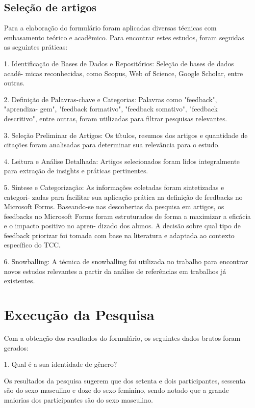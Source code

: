 \subsection{Seleção de artigos}

Para a elaboração do formulário foram aplicadas diversas técnicas com embasamento teórico e acadêmico. Para encontrar estes estudos, foram seguidas as seguintes práticas:

1. Identificação de Bases de Dados e Repositórios: Seleção de bases de dados acadê-
micas reconhecidas, como Scopus, Web of Science, Google Scholar, entre outras.

2. Definição de Palavras-chave e Categorias: Palavras como "feedback", "aprendiza-
gem", "feedback formativo", "feedback somativo", "feedback descritivo", entre outras, foram
utilizadas para filtrar pesquisas relevantes.

3. Seleção Preliminar de Artigos: Os títulos, resumos dos artigos e quantidade de
citações foram analisadas para determinar sua relevância para o estudo.

4. Leitura e Análise Detalhada: Artigos selecionados foram lidos integralmente para
extração de insights e práticas pertinentes.

5. Síntese e Categorização: As informações coletadas foram sintetizadas e categori-
zadas para facilitar sua aplicação prática na definição de feedbacks no Microsoft Forms.
Baseando-se nas descobertas da pesquisa em artigos, os feedbacks no Microsoft
Forms foram estruturados de forma a maximizar a eficácia e o impacto positivo no apren-
dizado dos alunos. A decisão sobre qual tipo de feedback priorizar foi tomada com base
na literatura e adaptada ao contexto específico do TCC.

6. Snowballing:  A técnica de snowballing foi utilizada no trabalho para encontrar novos estudos relevantes a partir da análise de referências em trabalhos já existentes.

\section{Execução da Pesquisa}

Com a obtenção dos resultados do formulário, os seguintes dados brutos foram gerados:

1. Qual é a sua identidade de gênero?

Os resultados da pesquisa sugerem que dos setenta e dois participantes, sessenta são do sexo masculino e doze do sexo feminino, sendo notado que a grande maiorias dos participantes são do sexo masculino.

